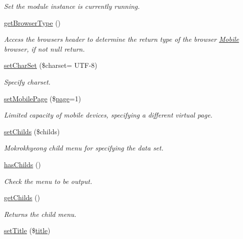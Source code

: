 \begin{DoxyCompactItemize}
\begin{DoxyCompactList}\small\item\em Set the module instance is currently running. \end{DoxyCompactList}\item 
\hyperlink{classmobileXE_a462a4900af63aa2bfbcea2168afbe876}{get\+Browser\+Type} ()
\begin{DoxyCompactList}\small\item\em Access the browser\textquotesingle{}s header to determine the return type of the browser \hyperlink{classMobile}{Mobile} browser, if not null return. \end{DoxyCompactList}\item 
\hyperlink{classmobileXE_ad12dcc0e8a5dd3a507587516e3a62f2a}{set\+Char\+Set} (\$charset= \textquotesingle{}U\+TF-\/8\textquotesingle{})
\begin{DoxyCompactList}\small\item\em Specify charset. \end{DoxyCompactList}\item 
\hyperlink{classmobileXE_a462ec879b69ab476662754aec66800dd}{set\+Mobile\+Page} (\$\hyperlink{classpage}{page}=1)
\begin{DoxyCompactList}\small\item\em Limited capacity of mobile devices, specifying a different virtual page. \end{DoxyCompactList}\item 
\hyperlink{classmobileXE_a0ea0dec157552b699d23388b257d22a6}{set\+Childs} (\$childs)
\begin{DoxyCompactList}\small\item\em Mokrokhyeong child menu for specifying the data set. \end{DoxyCompactList}\item 
\hyperlink{classmobileXE_a680f6a6b774bf12be4c67b6a9215f1ea}{has\+Childs} ()
\begin{DoxyCompactList}\small\item\em Check the menu to be output. \end{DoxyCompactList}\item 
\hyperlink{classmobileXE_a650f04e4701a5a1ae2ddceeb0f401166}{get\+Childs} ()
\begin{DoxyCompactList}\small\item\em Returns the child menu. \end{DoxyCompactList}\item 
\hyperlink{classmobileXE_a6ae064d89d2b926d7c96f59257692a01}{set\+Title} (\$\hyperlink{ko_8install_8php_a5b072c5fd1d2228c6ba5cee13cd142e3}{title})

\end{DoxyCompactItemize}
